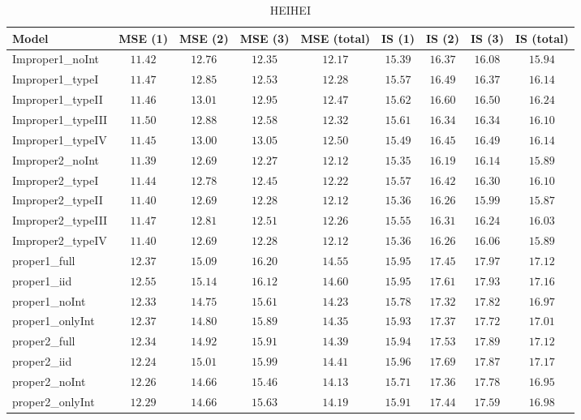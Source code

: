 \begin{table}

\caption{\label{tab:model-choice-sc5}HEIHEI}
\centering
\begin{tabular}{lcccccccc}
\hline
Model  & MSE (1) & MSE (2) & MSE (3) & MSE (total) & IS (1) & IS (2) & IS (3) & \multicolumn{1}{c}{IS (total)} \\ 
\hline
Improper1_noInt  & $11.42$ & $12.76$ & $12.35$ & $12.17$ & $15.39$ & $16.37$ & $16.08$ & $15.94$ \\
Improper1_typeI  & $11.47$ & $12.85$ & $12.53$ & $12.28$ & $15.57$ & $16.49$ & $16.37$ & $16.14$ \\
Improper1_typeII  & $11.46$ & $13.01$ & $12.95$ & $12.47$ & $15.62$ & $16.60$ & $16.50$ & $16.24$ \\
Improper1_typeIII  & $11.50$ & $12.88$ & $12.58$ & $12.32$ & $15.61$ & $16.34$ & $16.34$ & $16.10$ \\
Improper1_typeIV  & $11.45$ & $13.00$ & $13.05$ & $12.50$ & $15.49$ & $16.45$ & $16.49$ & $16.14$ \\
Improper2_noInt  & $11.39$ & $12.69$ & $12.27$ & $12.12$ & $15.35$ & $16.19$ & $16.14$ & $15.89$ \\
Improper2_typeI  & $11.44$ & $12.78$ & $12.45$ & $12.22$ & $15.57$ & $16.42$ & $16.30$ & $16.10$ \\
Improper2_typeII  & $11.40$ & $12.69$ & $12.28$ & $12.12$ & $15.36$ & $16.26$ & $15.99$ & $15.87$ \\
Improper2_typeIII  & $11.47$ & $12.81$ & $12.51$ & $12.26$ & $15.55$ & $16.31$ & $16.24$ & $16.03$ \\
Improper2_typeIV  & $11.40$ & $12.69$ & $12.28$ & $12.12$ & $15.36$ & $16.26$ & $16.06$ & $15.89$ \\
proper1_full  & $12.37$ & $15.09$ & $16.20$ & $14.55$ & $15.95$ & $17.45$ & $17.97$ & $17.12$ \\
proper1_iid  & $12.55$ & $15.14$ & $16.12$ & $14.60$ & $15.95$ & $17.61$ & $17.93$ & $17.16$ \\
proper1_noInt  & $12.33$ & $14.75$ & $15.61$ & $14.23$ & $15.78$ & $17.32$ & $17.82$ & $16.97$ \\
proper1_onlyInt  & $12.37$ & $14.80$ & $15.89$ & $14.35$ & $15.93$ & $17.37$ & $17.72$ & $17.01$ \\
proper2_full  & $12.34$ & $14.92$ & $15.91$ & $14.39$ & $15.94$ & $17.53$ & $17.89$ & $17.12$ \\
proper2_iid  & $12.24$ & $15.01$ & $15.99$ & $14.41$ & $15.96$ & $17.69$ & $17.87$ & $17.17$ \\
proper2_noInt  & $12.26$ & $14.66$ & $15.46$ & $14.13$ & $15.71$ & $17.36$ & $17.78$ & $16.95$ \\
proper2_onlyInt  & $12.29$ & $14.66$ & $15.63$ & $14.19$ & $15.91$ & $17.44$ & $17.59$ & $16.98$ \\
\hline 
\end{tabular}

\end{table}